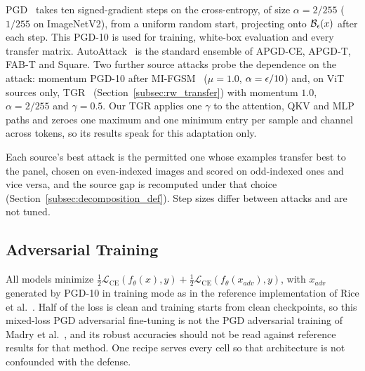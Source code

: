 PGD~\cite{madry2018towards} takes ten signed-gradient steps on the cross-entropy, of size $\alpha = 2/255$ ($1/255$ on ImageNetV2), from a uniform random start, projecting onto $\mathcal{B}_\epsilon(x)$ after each step. This PGD-10 is used for training, white-box evaluation and every transfer matrix. AutoAttack~\cite{croce2020reliable} is the standard ensemble of APGD-CE, APGD-T, FAB-T and Square. Two further source attacks probe the dependence on the attack: momentum PGD-10 after MI-FGSM~\cite{dong2018boosting} ($\mu = 1.0$, $\alpha = \epsilon/10$) and, on ViT sources only, TGR~\cite{zhang2023tgr} (Section~\ref{subsec:rw_transfer}) with momentum $1.0$, $\alpha = 2/255$ and $\gamma = 0.5$. Our TGR applies one $\gamma$ to the attention, QKV and MLP paths and zeroes one maximum and one minimum entry per sample and channel across tokens, so its results speak for this adaptation only.

Each source's best attack is the permitted one whose examples transfer best to the panel, chosen on even-indexed images and scored on odd-indexed ones and vice versa, and the source gap is recomputed under that choice (Section~\ref{subsec:decomposition_def}). Step sizes differ between attacks and are not tuned.

\subsection{Adversarial Training}
\label{subsec:training}

All models minimize $\tfrac12\mathcal{L}_{\mathrm{CE}}(f_\theta(x), y) + \tfrac12\mathcal{L}_{\mathrm{CE}}(f_\theta(x_{adv}), y)$, with $x_{adv}$ generated by PGD-10 in training mode as in the reference implementation of Rice et al.~\cite{rice2020overfitting}. Half of the loss is clean and training starts from clean checkpoints, so this mixed-loss PGD adversarial fine-tuning is not the PGD adversarial training of Madry et al.~\cite{madry2018towards}, and its robust accuracies should not be read against reference results for that method. One recipe serves every cell so that architecture is not confounded with the defense.

